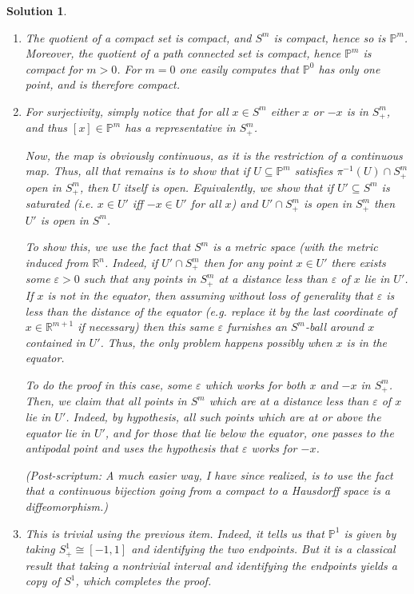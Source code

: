 \documentclass{article}
\theoremstyle{plain}
\theoremstyle{nonumberplain}
\newtheorem{sol}{Solution}
\newcommand{\R}{\mathbb{R}}
\newcommand{\PP}{\mathbb{P}}
\begin{document}
\begin{sol}
\begin{enumerate}
\item The quotient of a compact set is compact, and $S^{m}$ is compact, hence so is $\PP^m$. Moreover, the quotient of a path connected set is compact, hence $\PP^m$ is compact for $m > 0$. For $m = 0$ one easily computes that $\PP^0$ has only one point, and is therefore compact.
\item For surjectivity, simply notice that for all $x \in S^m$ either $x$ or $-x$ is in $S^m_+$, and thus $[x] \in \PP^m$ has a representative in $S^m_+$.

Now, the map is obviously continuous, as it is the restriction of a continuous map. Thus, all that remains is to show that if $U \subseteq \PP^m$ satisfies $\pi^{-1}(U) \cap S^m_+$ open in $S^m_+$, then $U$ itself is open. Equivalently, we show that if $U' \subseteq S^m$ is saturated (i.e. $x \in U'$ iff $-x \in U'$ for all $x$) and $U' \cap S^m_+$ is open in $S^m_+$ then $U'$ is open in $S^m$.

To show this, we use the fact that $S^m$ is a metric space (with the metric induced from $\R^n$. Indeed, if $U' \cap S^m_+$ then for any point $x \in U'$ there exists some $\varepsilon > 0$ such that any points in $S^m_+$ at a distance less than $\varepsilon$ of $x$ lie in $U'$. If $x$ is not in the equator, then assuming without loss of generality that $\varepsilon$ is less than the distance of the equator (e.g. replace it by the last coordinate of $x \in \R^{m+1}$ if necessary) then this same $\varepsilon$ furnishes an $S^m$-ball around $x$ contained in $U'$. Thus, the only problem happens possibly when $x$ is in the equator.

To do the proof in this case, some $\varepsilon$ which works for both $x$ and $-x$ in $S^m_+$. Then, we claim that all points in $S^m$ which are at a distance less than $\varepsilon$ of $x$ lie in $U'$. Indeed, by hypothesis, all such points which are at or above the equator lie in $U'$, and for those that lie below the equator, one passes to the antipodal point and uses the hypothesis that $\varepsilon$ works for $-x$.

(Post-scriptum: A much easier way, I have since realized, is to use the fact that a continuous bijection going from a compact to a Hausdorff space is a diffeomorphism.)

\item This is trivial using the previous item. Indeed, it tells us that $\PP^1$ is given by taking $S^1_+ \cong [-1,1]$ and identifying the two endpoints. But it is a classical result that taking a nontrivial interval and identifying the endpoints yields a copy of $S^1$, which completes the proof.


\end{enumerate}
\end{sol}
\end{document}
